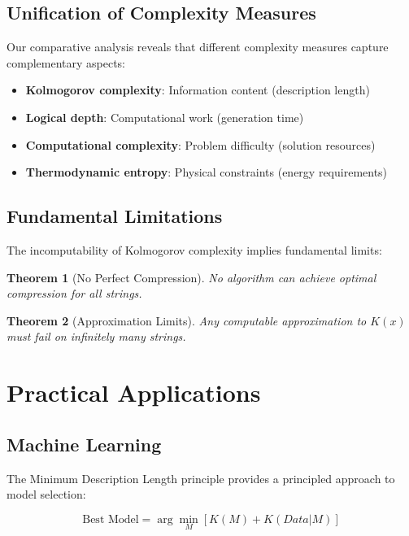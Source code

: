 \documentclass[12pt,a4paper]{report}
\newtheorem{theorem}{Theorem}[chapter]
\begin{document}
\subsection{Unification of Complexity Measures}

Our comparative analysis reveals that different complexity measures capture complementary aspects:

\begin{itemize}
    \item \textbf{Kolmogorov complexity}: Information content (description length)
    \item \textbf{Logical depth}: Computational work (generation time)
    \item \textbf{Computational complexity}: Problem difficulty (solution resources)
    \item \textbf{Thermodynamic entropy}: Physical constraints (energy requirements)
\end{itemize}

\subsection{Fundamental Limitations}

The incomputability of Kolmogorov complexity implies fundamental limits:

\begin{theorem}[No Perfect Compression]
No algorithm can achieve optimal compression for all strings.
\end{theorem}

\begin{theorem}[Approximation Limits]
Any computable approximation to $K(x)$ must fail on infinitely many strings.
\end{theorem}

\section{Practical Applications}

\subsection{Machine Learning}

The Minimum Description Length principle provides a principled approach to model selection:

\begin{equation}
\text{Best Model} = \arg\min_M [K(M) + K(Data|M)]
\end{equation}
\end{document}
